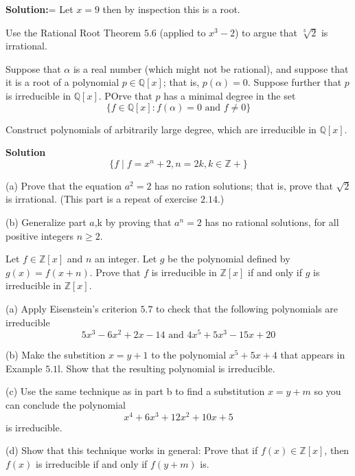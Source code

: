 \textbf{Solution:}=
Let $x = 9$ then by inspection this is a root.

\begin{tcolorbox}[title=Problem 9, breakable]
    Use the Rational Root Theorem $5.6$ (applied to $x^3 - 2$)
    to argue that $\sqrt[3]{2}$ is irrational.
\end{tcolorbox}

\begin{tcolorbox}[title=Problem 10, breakable]
    Suppose that $\alpha$ is a real number (which might 
    not be rational), and suppose that it is a root of a 
    polynomial $p \in \mathbb{Q}[x]$; that is,
    $p(\alpha) = 0$. Suppose further that $p$ is irreducible
    in $\mathbb{Q}[x]$. POrve that $p$ has a minimal degree in the 
    set 
    \[\{f \in \mathbb{Q}[x] : f(\alpha) = 0 \text{ and } f \ne 0\}\]
\end{tcolorbox}

\begin{tcolorbox}[title=Problem 12, breakable]
    Construct polynomials of arbitrarily large degree,
        which are irreducible in $\mathbb{Q}[x]$.
\end{tcolorbox}

\textbf{Solution}
\[\{f \mid f = x^n + 2, n = 2k, k \in \mathbb{Z+}\}\]

\begin{tcolorbox}[title=Problem 13, breakable]
    (a) Prove that the equation $a^2 = 2$ has no ration solutions;
        that is, prove that $\sqrt{2}$ is irrational. (This part is a 
        repeat of exercise $2.14$.)

    (b) Generalize part $a$,k by proving that $a^n = 2$ has no rational 
        solutions, for all positive integers $n \ge 2$.
\end{tcolorbox}

\begin{tcolorbox}[title=Problem 14, breakable]
    Let $f \in \mathbb{Z}[x]$ and $n$ an integer.
    Let $g$ be the polynomial defined by $g(x) = f(x + n)$.
    Prove that $f$ is irreducible in $\mathbb{Z}[x]$ if and 
    only if $g$ is irreducible in $\mathbb{Z}[x]$.
\end{tcolorbox}

\begin{tcolorbox}[title=Problem 15, breakable]
    (a) Apply Eisenstein's criterion $5.7$ to check that the 
        following polynomials are irreducible
        \[5x^3 - 6x^2 + 2x - 14 \text{ and } 4x^5 + 5x^3 - 15x + 20\]

    (b) Make the substition $x = y + 1$ to the polynomial $x^5 + 5x + 4$
        that appears in Example $5.1$l. Show that the resulting polynomial
        is irreducible.

    (c) Use the same technique as in part b to find a substitution 
        $x = y + m$ so you can conclude the polynomial
        \[x^4 + 6x^3 + 12x^2 + 10x + 5\]
        is irreducible.

    (d) Show that this technique works in general: Prove that if 
        $f(x) \in \mathbb{Z}[x]$, then $f(x)$ is irreducible if 
        and only if $f(y + m)$ is.
\end{tcolorbox}

